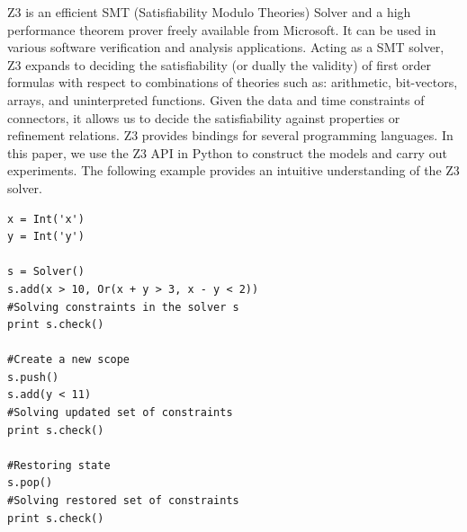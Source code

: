 \documentclass[preprint,3p]{elsarticle}
\begin{document}



Z3 \cite{MouraB08} is an efficient SMT (Satisfiability Modulo Theories) Solver and a high performance theorem prover freely available from Microsoft. It can be used in various software verification and analysis applications. Acting as a SMT solver, Z3 expands to deciding the satisfiability (or dually the validity) of first order formulas with respect to combinations of theories such as: arithmetic, bit-vectors, arrays, and uninterpreted functions. Given the data and time constraints of connectors, it allows us to decide the satisfiability against properties or refinement relations. Z3 provides bindings for several programming languages. In this paper, we use the Z3 API in Python to construct the models and carry out experiments. The following example provides an intuitive understanding of the Z3 solver.
\begin{lstlisting}[frame=single]
x = Int('x')
y = Int('y')

s = Solver()
s.add(x > 10, Or(x + y > 3, x - y < 2))
#Solving constraints in the solver s
print s.check()

#Create a new scope
s.push()
s.add(y < 11)
#Solving updated set of constraints
print s.check()

#Restoring state
s.pop()
#Solving restored set of constraints
print s.check()
\end{lstlisting}
\end{document}
